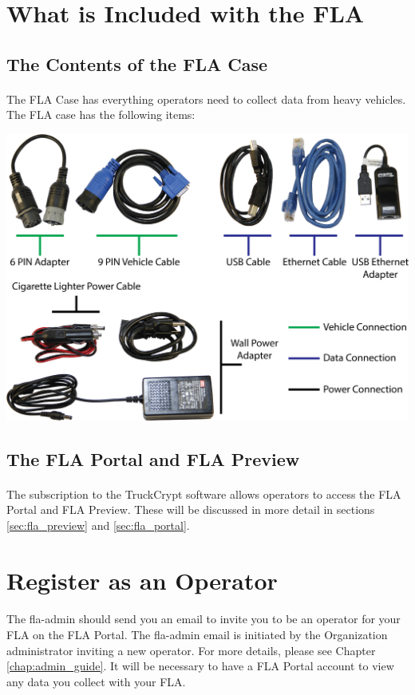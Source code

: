 \documentclass[11pt, oneside]{book}
\begin{document}
\section{What is Included with the FLA}


\subsection{The Contents of the FLA Case}
\paragraph{  }
The FLA Case has everything operators need to collect data from heavy vehicles. The FLA case has the following items:
\begin{center}
\includegraphics[width=.9\linewidth]{../media/graphics/cables_all}
\end{center}


\subsection{The FLA Portal and FLA Preview}
\paragraph{  }
The subscription to the TruckCrypt software allows operators to access the FLA Portal and FLA Preview. These will be discussed in more detail in sections
 \ref{sec:fla_preview} and \ref{sec:fla_portal}.


\section{Register as an Operator}
\paragraph{  }
The fla-admin should send you an email to invite you to be an operator for your FLA on the FLA Portal. The fla-admin email is initiated by the Organization administrator inviting a new operator. For more details, please see Chapter \ref{chap:admin_guide}. It will be necessary to have a FLA Portal account to view any data you collect with your FLA.
\end{document}
